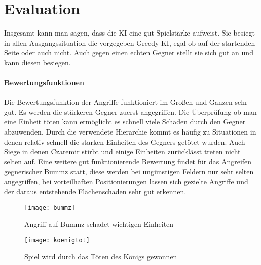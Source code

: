 

\chapter{Evaluation}

Insgesamt kann man sagen, dass die KI eine gut Spielstärke aufweist. Sie besiegt in allen Ausgangssituation die vorgegeben Greedy-KI, egal ob auf der startenden Seite oder auch nicht. Auch gegen einen echten Gegner stellt sie sich gut an und kann diesen besiegen. 

\subsubsection{Bewertungsfunktionen}

Die Bewertungsfunktion der Angriffe funktioniert im Großen und Ganzen sehr gut. Es werden die stärkeren Gegner zuerst angegriffen. Die Überprüfung ob man eine Einheit töten kann ermöglicht es schnell viele Schaden durch den Gegner abzuwenden. Durch die verwendete Hierarchie kommt es häufig zu Situationen in denen relativ schnell die starken Einheiten des Gegners getötet wurden. Auch Siege in denen Czaremir stirbt und einige Einheiten zurücklässt treten nicht selten auf. Eine weitere gut funktionierende Bewertung findet für das Angreifen gegnerischer Bummz statt, diese werden bei ungünstigen Feldern nur sehr selten angegriffen, bei vorteilhaften Positionierungen lassen sich gezielte Angriffe und der daraus entstehende Flächenschaden sehr gut erkennen. 

\begin{figure}[H]
	\begin{minipage}[b]{.4\linewidth} %
		\texttt{[image: bummz]}
		\caption{Angriff auf Bummz schadet wichtigen Einheiten}
	\end{minipage}
	\hspace{.1\linewidth}%
	\begin{minipage}[b]{.4\linewidth} %
		\texttt{[image: koenigtot]}
		\caption{Spiel wird durch das Töten des Königs gewonnen}
	\end{minipage}
\end{figure}

